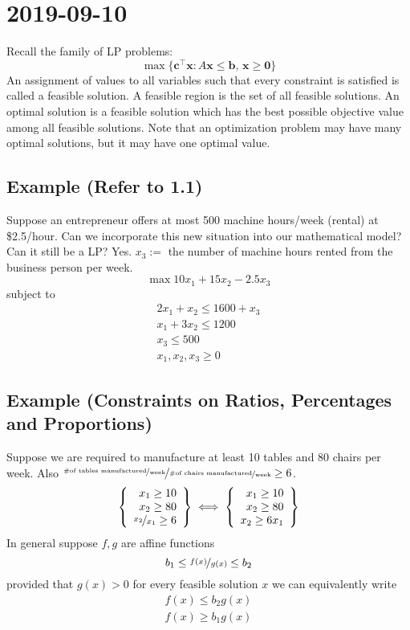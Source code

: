 \section{2019-09-10}
Recall the family of LP problems:
\[\max \{\bm{c}^\top \bm{x} : A\bm{x}\le \bm{b},\,\bm{x}\ge \bm{0}\} \]
An assignment of values to all variables such that every
constraint is satisfied is called a feasible solution.
A feasible region is the set of all feasible solutions.
An optimal solution is a feasible solution which has the best
possible objective value among all feasible solutions.
Note that an optimization problem may have many optimal
solutions, but it may have one optimal value.
\subsection{Example (Refer to 1.1)}
Suppose an entrepreneur offers at most 500 machine hours/week
(rental) at \$2.5/hour. Can we incorporate this new situation
into our mathematical model? Can it still be a LP? Yes.
$x_3:=$ the number of machine hours rented from the business
person per week.
\[\max 10x_1+15x_2-2.5x_3\]
subject to
\begin{align*}
    2x_1+x_2\le 1600+x_3\\
    x_1+3x_2\le 1200\\
    x_3\le 500\\
    x_1,x_2,x_3\ge 0
\end{align*}

\subsection{Example (Constraints on Ratios, Percentages and Proportions)}
Suppose we are required to manufacture at least 10 tables and
80 chairs per week. Also 
$\nicefrac{\nicefrac{\text{\#of tables manufactured}}{\text{week}}}
{\nicefrac{\text{\#of chairs manufactured}}{\text{week}}}
\ge 6$.
\[
   \left\{\begin{array}{r}
        x_1\ge 10\\
        x_2\ge 80\\
        \nicefrac{x_2}{x_1}\ge 6
    \end{array}\right\}
    \iff
    \left\{\begin{array}{r}
        x_1\ge 10\\
        x_2\ge 80\\
        x_2\ge 6x_1
    \end{array}\right\}
\]
In general suppose $f,g$ are affine functions
\[
    b_1\le \nicefrac{f(x)}{g(x)}\le b_2
\]
provided that $g(x)>0$ for every feasible solution $x$ we
can equivalently write
\begin{align*}
    f(x)\le b_2 g(x)\\
    f(x)\ge b_1 g(x)
\end{align*}


